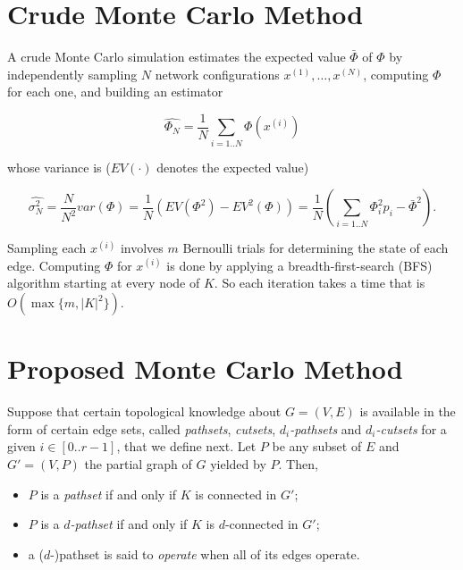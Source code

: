 \documentclass[a4paper]{article}
\begin{document}
\section{Crude Monte Carlo Method} \label{s:crude}

A crude Monte Carlo simulation estimates the expected value $\bar{\Phi}$ of $\Phi$ by independently sampling $N$ network configurations $x^{(1)},\dots,x^{(N)}$, computing $\Phi$ for each one, and building an estimator

\begin{equation*}
\widehat{\Phi_N}=\frac{1}{N}\sum_{i=1..N}\Phi(x^{(i)})
\end{equation*}

whose variance is ($EV(\cdot)$ denotes the expected value)

\begin{equation*}
\widehat{\sigma^2_N} = \frac{N}{N^2}\mathit{var}(\Phi) = \frac{1}{N}(EV(\Phi^2)-EV^2(\Phi)) = \frac{1}{N}(\sum_{i=1..N}\Phi_i^2p_i-\bar{\Phi}^2) .
\end{equation*}

Sampling each $x^{(i)}$ involves $m$ Bernoulli trials for determining the state of each edge. Computing $\Phi$ for $x^{(i)}$ is done by applying a breadth-first-search (BFS) algorithm starting at every node of $K$. So each iteration takes a time that is $O(\max\{m,|K|^2\})$.



\section{Proposed Monte Carlo Method} \label{s:bounded}

Suppose that certain topological knowledge about $G=(V,E)$ is available in the form of certain edge sets, called \emph{pathsets}, \emph{cutsets}, \emph{$d_i$-pathsets} and \emph{$d_i$-cutsets} for a given $i\in [0..r-1]$, that we define next. Let $P$ be any subset of $E$ and $G'=(V,P)$ the partial graph of $G$ yielded by $P$. Then,

\begin{itemize}
\item $P$ is a \emph{pathset} if and only if $K$ is connected in $G'$;
\item $P$ is a \emph{\mbox{$d$-pathset}} if and only if $K$ is \mbox{$d$-connected} in $G'$;
\item a \mbox{($d$-)pathset} is said to \emph{operate} when all of its edges operate.
\end{itemize}
\end{document}
